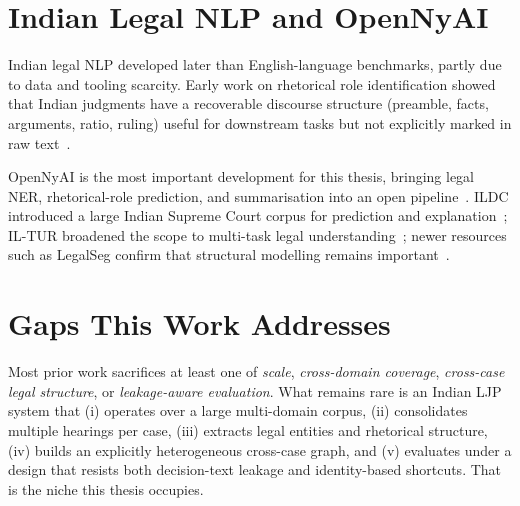 \section{Indian Legal NLP and OpenNyAI}

Indian legal NLP developed later than English-language benchmarks, partly due to data and tooling scarcity. Early work on rhetorical role identification showed that Indian judgments have a recoverable discourse structure (preamble, facts, arguments, ratio, ruling) useful for downstream tasks but not explicitly marked in raw text~\cite{bhattacharya2019rhetoricalroles}.

OpenNyAI is the most important development for this thesis, bringing legal NER, rhetorical-role prediction, and summarisation into an open pipeline~\cite{kalamkar2022ner, opennyai2024docs, opennyai2024about}. ILDC introduced a large Indian Supreme Court corpus for prediction and explanation~\cite{malik2021ildc}; IL-TUR broadened the scope to multi-task legal understanding~\cite{joshi2024iltur}; newer resources such as LegalSeg confirm that structural modelling remains important~\cite{nigam2025legalseg}.

\section{Gaps This Work Addresses}

Most prior work sacrifices at least one of \emph{scale}, \emph{cross-domain coverage}, \emph{cross-case legal structure}, or \emph{leakage-aware evaluation}. What remains rare is an Indian LJP system that (i) operates over a large multi-domain corpus, (ii) consolidates multiple hearings per case, (iii) extracts legal entities and rhetorical structure, (iv) builds an explicitly heterogeneous cross-case graph, and (v) evaluates under a design that resists both decision-text leakage and identity-based shortcuts. That is the niche this thesis occupies.
